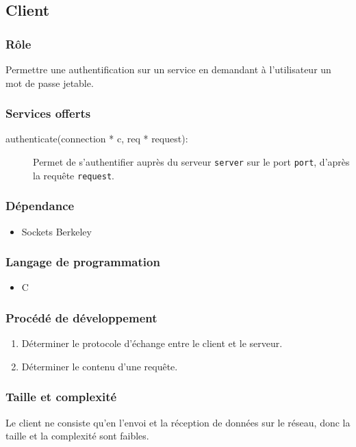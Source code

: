 \documentclass{"../../res/univ-projet"}
\begin{document}
\subsection{Client}
    \subsubsection{Rôle}
        Permettre une authentification sur un service en demandant à
    l'utilisateur un mot de passe jetable.

    \subsubsection{Services offerts}
    \begin{description}
        \item[authenticate(connection * c, req * request):] Permet
            de s'authentifier auprès du serveur \verb?server? sur 
            le port \verb?port?, d'après la requête \verb?request?.
    \end{description}

    \subsubsection{Dépendance}
    \begin{itemize}
        \item Sockets Berkeley
    \end{itemize}

    \subsubsection{Langage de programmation}
    \begin{itemize}
        \item C
    \end{itemize}

    \subsubsection{Procédé de développement}
    \begin{enumerate}
        \item Déterminer le protocole d'échange entre le client et le
            serveur.
        \item Déterminer le contenu d'une requête.
    \end{enumerate}

    \subsubsection{Taille et complexité}
        Le client ne consiste qu'en l'envoi et la réception de données sur le
        réseau, donc la taille et la complexité sont faibles.
\end{document}
